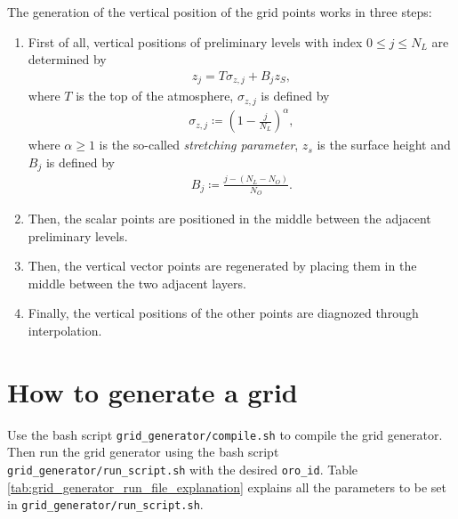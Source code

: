 \documentclass[10pt]{report}
\begin{document}
The generation of the vertical position of the grid points works in three steps:
%
\begin{enumerate}
\item First of all, vertical positions of preliminary levels with index $0 \leq j \leq N_L$ are determined by
%
\begin{align}
z_j = T\sigma_{z, j} + B_jz_S,
\end{align}
%
where $T$ is the top of the atmosphere, $\sigma_{z, j}$ is defined by
%
\begin{align}
\sigma_{z, j} \coloneqq \left(1 - \frac{j}{N_L}\right)^\alpha,
\end{align}
%
where $\alpha \geq 1$ is the so-called \textit{stretching parameter}, $z_s$ is the surface height and $B_j$ is defined by
%
\begin{align}
B_j \coloneqq \frac{j - \left(N_L - N_O\right)}{N_O}.
\end{align}
%
\item Then, the scalar points are positioned in the middle between the adjacent preliminary levels.
\item Then, the vertical vector points are regenerated by placing them in the middle between the two adjacent layers.
\item Finally, the vertical positions of the other points are diagnozed through interpolation.
\end{enumerate}

\section{How to generate a grid}
\label{sec:how_to_generate_a_grid}

Use the bash script \texttt{grid\_generator/compile.sh} to compile the grid generator. Then run the grid generator using the bash script \texttt{grid\_generator/run\_script.sh} with the desired \texttt{\texttt{oro\_id}}. Table \ref{tab:grid_generator_run_file_explanation} explains all the parameters to be set in \texttt{grid\_generator/run\_script.sh}.
\end{document}
